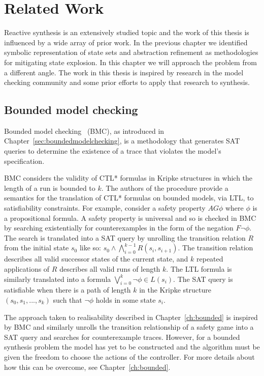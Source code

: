 \chapter{Related Work}
\label{ch:relatedwork}

Reactive synthesis is an extensively studied topic and the work of this thesis is influenced by a wide array of prior work. In the previous chapter we identified symbolic representation of state sets and abstraction refinement as methodologies for mitigating state explosion. In this chapter we will approach the problem from a different angle. The work in this thesis is inspired by research in the model checking community and some prior efforts to apply that research to synthesis.

\section{Bounded model checking}

Bounded model checking~\cite{Biere99} (BMC), as introduced in Chapter~\ref{sec:boundedmodelchecking}, is a methodology that generates SAT queries to determine the existence of a trace that violates the model's specification. 

BMC considers the validity of CTL* formulas in Kripke structures in which the length of a run is bounded to $k$. The authors of the procedure provide a semantics for the translation of CTL* formulas on bounded models, via LTL, to satisfiability constraints. For example, consider a safety property $AG \phi$ where $\phi$ is a propositional formula. A safety property is universal and so is checked in BMC by searching existentially for counterexamples in the form of the negation $F \lnot \phi$. The search is translated into a SAT query by unrolling the transition relation $R$ from the initial state $s_0$ like so: $s_0 \land \bigwedge_{i=0}^{k-1} R(s_i, s_{i+1})$. The transition relation describes all valid successor states of the current state, and $k$ repeated applications of $R$ describes all valid runs of length $k$.  The LTL formula is similarly translated into a formula $\bigvee_{i=0}^{k} \lnot \phi \in L(s_i)$. The SAT query is satisfiable when there is a path of length $k$ in the Kripke structure $(s_0, s_1, ..., s_k)$ such that $\lnot \phi$ holds in some state $s_i$.

The approach taken to realisability described in Chapter~\ref{ch:bounded} is inspired by BMC and similarly unrolls the transition relationship of a safety game into a SAT query and searches for counterexample traces. However, for a bounded synthesis problem the model has yet to be constructed and the algorithm must be given the freedom to choose the actions of the controller.  For more details about how this can be overcome, see Chapter~\ref{ch:bounded}.

